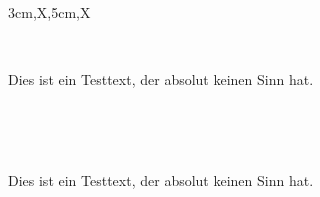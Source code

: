 \documentclass[a3paper,scifiposter,style=scifi]{tubsposter}
\begin{document}
\begin{tubsposter}{3cm,X,5cm,X}
  \begin{posterrow}
    ~
  \end{posterrow}
  \begin{posterrow}[X,X,X]
    \begin{postercol}
      Dies ist ein Testtext, der absolut keinen Sinn hat.
    \end{postercol}
    \begin{postercol}[3cm,X]
      \begin{postersubrow}
        ~
      \end{postersubrow}
      \begin{postersubrow}
        ~
      \end{postersubrow}
    \end{postercol}
    \begin{postercol}
      Dies ist ein Testtext, der absolut keinen Sinn hat.
    \end{postercol}
  \end{posterrow}
  \begin{posterrow}
    ~
  \end{posterrow}
  \begin{posterrow}
    ~
  \end{posterrow}
\end{tubsposter}
\end{document}
